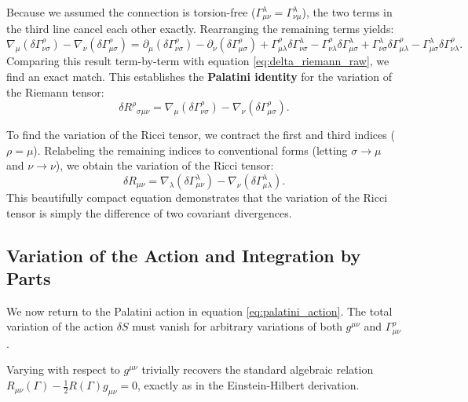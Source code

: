 \documentclass[11pt, a4paper]{report}
\begin{document}
Because we assumed the connection is torsion-free ($\Gamma^{\lambda}_{\mu\nu} = \Gamma^{\lambda}_{\nu\mu}$), the two terms in the third line cancel each other exactly. Rearranging the remaining terms yields:
\begin{equation}
\nabla_{\mu}(\delta\Gamma^{\rho}_{\nu\sigma}) - \nabla_{\nu}(\delta\Gamma^{\rho}_{\mu\sigma}) = \partial_{\mu}(\delta\Gamma^{\rho}_{\nu\sigma}) - \partial_{\nu}(\delta\Gamma^{\rho}_{\mu\sigma}) + \Gamma^{\rho}_{\mu\lambda}\delta\Gamma^{\lambda}_{\nu\sigma} - \Gamma^{\rho}_{\nu\lambda}\delta\Gamma^{\lambda}_{\mu\sigma} + \Gamma^{\lambda}_{\nu\sigma}\delta\Gamma^{\rho}_{\mu\lambda} - \Gamma^{\lambda}_{\mu\sigma}\delta\Gamma^{\rho}_{\nu\lambda}.
\end{equation}
Comparing this result term-by-term with equation \eqref{eq:delta_riemann_raw}, we find an exact match. This establishes the \textbf{Palatini identity} for the variation of the Riemann tensor:
\begin{equation}
\label{eq:palatini_riemann}
\delta{R^{\rho}}_{\sigma\mu\nu} = \nabla_{\mu}(\delta\Gamma^{\rho}_{\nu\sigma}) - \nabla_{\nu}(\delta\Gamma^{\rho}_{\mu\sigma}).
\end{equation}

To find the variation of the Ricci tensor, we contract the first and third indices ($\rho = \mu$). Relabeling the remaining indices to conventional forms (letting $\sigma \to \mu$ and $\nu \to \nu$), we obtain the variation of the Ricci tensor:
\begin{equation}
\label{eq:palatini_ricci}
\delta R_{\mu\nu} = \nabla_{\lambda}(\delta\Gamma^{\lambda}_{\mu\nu}) - \nabla_{\nu}(\delta\Gamma^{\lambda}_{\mu\lambda}).
\end{equation}
This beautifully compact equation demonstrates that the variation of the Ricci tensor is simply the difference of two covariant divergences.

\subsection{Variation of the Action and Integration by Parts}

We now return to the Palatini action in equation \eqref{eq:palatini_action}. The total variation of the action $\delta S$ must vanish for arbitrary variations of both $g^{\mu\nu}$ and $\Gamma^{\rho}_{\mu\nu}$. 

Varying with respect to $g^{\mu\nu}$ trivially recovers the standard algebraic relation $R_{\mu\nu}(\Gamma) - \frac{1}{2}R(\Gamma) g_{\mu\nu} = 0$, exactly as in the Einstein-Hilbert derivation.
\end{document}
